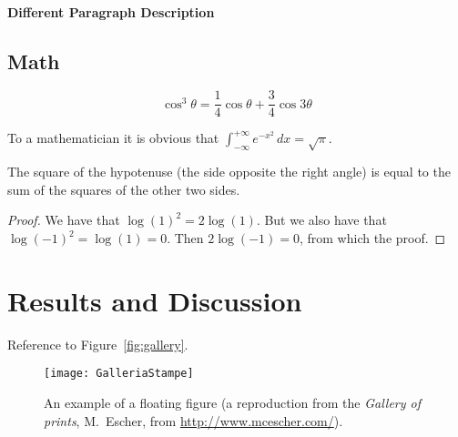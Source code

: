 \documentclass[
10pt, %
a4paper, %
oneside, %
headinclude,footinclude, %
BCOR5mm, %
]{scrartcl}
\begin{document}
\paragraph{Different Paragraph Description} %


\subsection{Math}


\begin{equation}
\cos^3 \theta =\frac{1}{4}\cos\theta+\frac{3}{4}\cos 3\theta
\label{eq:refname2}
\end{equation}


\begin{definition}[Gauss] 
To a mathematician it is obvious that
$\int_{-\infty}^{+\infty}
e^{-x^2}\,dx=\sqrt{\pi}$. 
\end{definition} 

\begin{theorem}[Pythagoras]
The square of the hypotenuse (the side opposite the right angle) is equal to the sum of the squares of the other two sides.
\end{theorem}

\begin{proof} 
We have that $\log(1)^2 = 2\log(1)$.
But we also have that $\log(-1)^2=\log(1)=0$.
Then $2\log(-1)=0$, from which the proof.
\end{proof}


\section{Results and Discussion}

Reference to Figure~\vref{fig:gallery}. %

\begin{figure}[tb]
\centering 
\texttt{[image: GalleriaStampe]} 
\caption[An example of a floating figure]{An example of a floating figure (a reproduction from the \emph{Gallery of prints}, M.~Escher, from \url{http://www.mcescher.com/}).} %
\label{fig:gallery} 
\end{figure}
\end{document}
